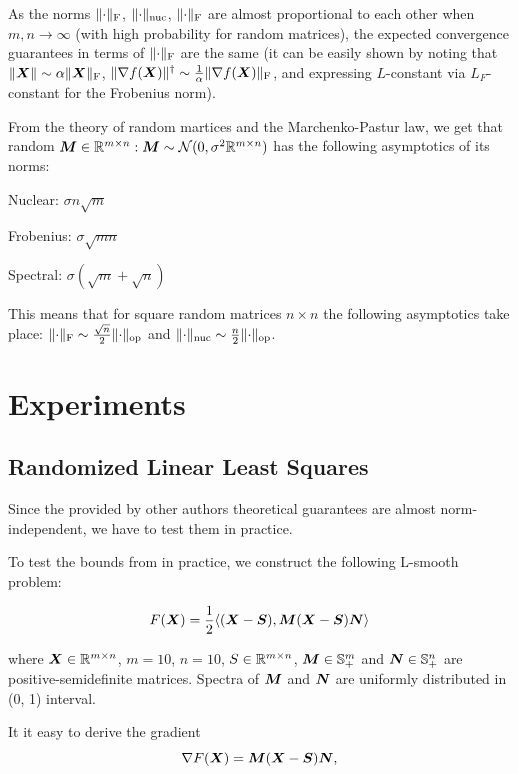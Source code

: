 \documentclass{article} %
\newcommand{\norm}[1]{\lVert #1\rVert}
\newcommand{\Rmn}{\R^{m\times n}}
\newcommand{\cN}{\mathcal{N}}
\DeclarePairedDelimiter{\normf}{\|}{\|_\mathrm{F}}
\DeclarePairedDelimiter{\norms}{\|}{\|_{\mathrm{op}}}
\DeclarePairedDelimiter{\normn}{\|}{\|_{\mathrm{nuc}}}
\def\<#1,#2>{\langle #1,#2\rangle}
\begin{document}
    As the norms $\normf{\cdot}$, $\normn{\cdot}$, $\normf{\cdot}$ are almost proportional to each other when $m, n \rightarrow \infty$ (with high probability for random matrices), the expected convergence guarantees in terms of $\normf{\cdot}$ are the same (it can be easily shown by noting that $\norm{\mX}\sim\alpha\normf{\mX}$, $\norm{\nabla f(\mX)}^\dagger \sim \frac{1}{\alpha} \normf{\nabla f(\mX)}$, and expressing $L$-constant via $L_F$-constant for the Frobenius norm).

    From the theory of random martices and the Marchenko-Pastur law, we get that random $\mM \in \Rmn: \mM \sim \cN(0, \sigma^2 \Rmn)$ has the following asymptotics of its norms:

    Nuclear: $\sigma n \sqrt{m}$

    Frobenius: $\sigma \sqrt{m n}$
    
    Spectral: $\sigma(\sqrt{m} + \sqrt{n})$

    This means that for square random matrices $n \times n$  the following asymptotics take place: $\normf{\cdot} \sim \frac{\sqrt{n}}{2}\norms{\cdot}$ and $\normn{\cdot} \sim \frac{n}{2}\norms{\cdot}$.


\section{Experiments}
    \subsection{Randomized Linear Least Squares}
    Since the provided by other authors \cite{kovalev2025understanding,riabinin2025gluon} theoretical guarantees are almost norm-independent, we have to test them in practice.

    To test the bounds from \cite{kovalev2025understanding} in practice, we construct the following L-smooth problem:

    \begin{equation}\label{eq:lls}
        F(\mX) = \frac{1}{2} \<(\mX-\mS), \mM (\mX - \mS) \mN>
    \end{equation}

    where $\mX \in \Rmn$, $m=10$, $n=10$, $S \in \Rmn$, ${\bm{M}} \in \mathbb{S}^m_{+}$ and ${\bm{N}} \in \mathbb{S}^n_{+}$ are positive-semidefinite matrices. Spectra of ${\bm{M}}$ and ${\bm{N}}$ are uniformly distributed in (0, 1) interval.

    It it easy to derive the gradient
    \begin{equation}\label{eq:grad_lls}
        \nabla F({\bm{X}}) = {\bm{M}} ({\bm{X}} - {\bm{S}}) {\bm{N}},
    \end{equation}
\end{document}
